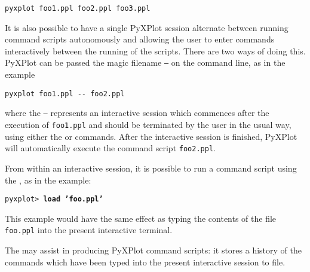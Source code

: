 \begin{verbatim}
pyxplot foo1.ppl foo2.ppl foo3.ppl
\end{verbatim}

It is also possible to have a single PyXPlot session alternate between running
command scripts autonomously and allowing the user to enter commands
interactively between the running of the scripts. There are two ways of doing
this.  PyXPlot can be passed the magic filename {\tt --} on the command line,
as in the example

\begin{verbatim}
pyxplot foo1.ppl -- foo2.ppl
\end{verbatim}

\noindent where the {\tt --} represents an interactive session which commences
after the execution of {\tt foo1.ppl} and should be terminated by the user in
the usual way, using either the  or  commands.
After the interactive session is finished, PyXPlot will automatically execute
the command script {\tt foo2.ppl}.

From within an interactive session, it is possible to run a command script
using the , as in the example:

\vspace{3mm}
\noindent\texttt{pyxplot> \textbf{load 'foo.ppl'}}
\vspace{3mm}

\noindent This example would have the same effect as typing the contents of the
file {\tt foo.ppl} into the present interactive terminal.

The  may assist in producing PyXPlot command scripts: it stores a
history of the commands which have been typed into the present interactive
session to file.


